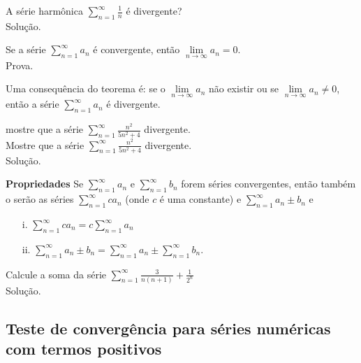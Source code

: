 \begin{ex}
	A série harmônica $\sum_{n=1}^{\infty}\frac{1}{n}$ é divergente?\\
	Solução.
\end{ex}
\vspace*{5cm}

\begin{teo}
	Se a série $\sum_{n=1}^{\infty} a_{n}$ é convergente, então $\lim\limits_{n\longrightarrow \infty} a_{n}=0$.\\
	Prova.
\end{teo}
\vspace*{5cm}

Uma consequência do teorema é: se o $\lim\limits_{n\longrightarrow \infty} a_{n}$ não existir ou se $\lim\limits_{n\longrightarrow \infty} a_{n}\neq 0$, então a série  $\sum_{n=1}^{\infty} a_{n}$ é divergente.
\begin{ex}

	mostre que a série $\sum_{n=1}^{\infty}\frac{n^{2}}{5n^{2}+4}$ divergente.\\

	Mostre que a série $\sum_{n=1}^{\infty}\frac{n^{2}}{5n^{2}+4}$ divergente.\\

	Solução.
\end{ex}
\vspace*{5cm}

\textbf{Propriedades} 
Se $\sum_{n=1}^{\infty} a_{n}$ e $\sum_{n=1}^{\infty} b_{n}$ forem séries convergentes, então também o serão as séries $\sum_{n=1}^{\infty} ca_{n}$ (onde $c$ é uma constante) e $\sum_{n=1}^{\infty} a_{n}\pm b_{n}$ e
\begin{itemize}
\item[i.] $\sum_{n=1}^{\infty} ca_{n}=c\sum_{n=1}^{\infty} a_{n}$

\item[ii.] $\sum_{n=1}^{\infty} a_{n}\pm b_{n}=\sum_{n=1}^{\infty} a_{n}\pm \sum_{n=1}^{\infty} b_{n}$.
\end{itemize}

\begin{ex}
	Calcule a soma da série $\sum_{n=1}^{\infty}\frac{3}{n(n+1)}+\frac{1}{2^{n}}$ \\
	Solução.
\end{ex}
\vspace*{5cm}
\subsection{Teste de convergência para séries numéricas com termos positivos}

